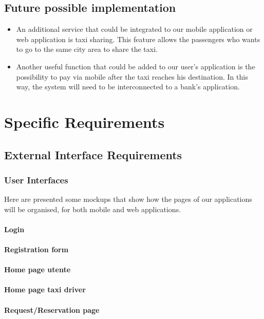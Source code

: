 \documentclass{article}
\begin{document}
   
	\subsection{Future possible implementation}
	    \begin{itemize}
    	    \item An additional service that could be integrated to our mobile application or web application is taxi sharing. This feature allows the passengers who wants to go to the same city area to share the taxi.
    	    \item Another useful function that could be added to our user's application is the possibility to pay via mobile after the taxi reaches his destination.
    	    In this way, the system will need to be interconnected to a bank's application.
	    \end{itemize}
\newpage	    
\section{Specific Requirements}
    \subsection{External Interface Requirements}
	    \subsubsection{User Interfaces}
            Here are presented some mockups that show how the pages of our applications will be organised, for both mobile and web applications.
            \paragraph{Login}
            \paragraph{Registration form}
            \paragraph{Home page utente}
            \paragraph{Home page taxi driver}
            \paragraph{Request/Reservation page}
\end{document}
